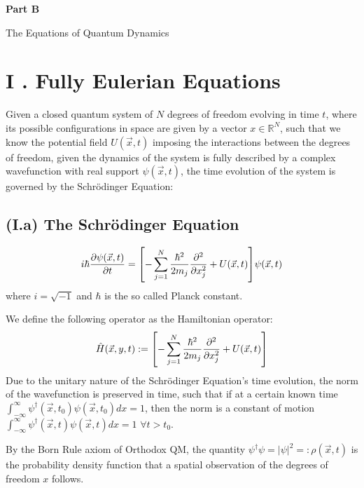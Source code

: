 \documentclass[11pt, a4paper]{article} %
\newcommand{\R}{\mathbb{R}} %
\newenvironment{kapituloBerria}[1][]
  {\clearpage           %
   \thispagestyle{empty}%
   \vspace*{\stretch{2}}%
   \raggedleft          %
   {\textbf{{\fontsize{60}{40}\selectfont \hspace{+9.5cm}#1\newline \newline}}}
   \bf
   \fontsize{30}{20}\selectfont
  }
  {\par %
   \vspace{\stretch{3}} %
   \clearpage           %
  }
\begin{document}
\newpage

\begin{kapituloBerria}[Part B]
The Equations of Quantum Dynamics
\end{kapituloBerria}


\section*{I . Fully Eulerian Equations}
Given a closed quantum system of $N$ degrees of freedom evolving in time $t$, where its possible configurations in space are given by a vector $x\in\R^N$, such that we know the potential field $U(\vec{x}, t)$ imposing the interactions between the degrees of freedom, given the dynamics of the system is fully described by a complex wavefunction with real support $\psi(\vec{x},t)$, the time evolution of the system is governed by the Schrödinger Equation:

\subsection*{(I.a) The Schrödinger Equation}
\begin{equation}\label{SE}
i\hbar \pdv{\psi(\vec{x},t)}{t} = \qty[-\sum_{j=1}^N\frac{\hbar^2}{2m_j}\pdv[2]{}{x_j} + U(\vec{x},t)]\psi(\vec{x},t)
\end{equation}
where $i=\sqrt{-1}$ and $\hbar$ is the so called Planck constant.

We define the following operator as the Hamiltonian operator:
\begin{equation}
\hat{H}(\vec{x}, y, t):=\qty[-\sum_{j=1}^N\frac{\hbar^2}{2m_j}\pdv[2]{}{x_j} + U(\vec{x},t)]
\end{equation}
Due to the unitary nature of the Schrödinger Equation's time evolution, the norm of the wavefunction is preserved in time, such that if at a certain known time $\int^\infty_{-\infty} \psi^\dagger(\vec{x},t_0)\psi(\vec{x},t_0)dx=1$, then the norm is a constant of motion $\int^\infty_{-\infty} \psi^\dagger(\vec{x},t)\psi(\vec{x},t)dx=1$ $\forall t>t_0$.

By the Born Rule axiom of Orthodox QM, the quantity $\psi^\dagger\psi=|\psi|^2=:\rho(\vec{x},t)$ is the probability density function that a spatial observation of the degrees of freedom $x$ follows.
\end{document}
